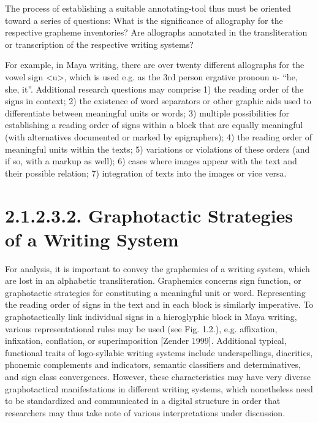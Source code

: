 \documentclass[amsthm,ebook]{saparticle}
\begin{document}
The process of establishing a suitable annotating-tool thus must be oriented toward a series of questions: What is the
significance of allography for the respective grapheme inventories? Are allographs annotated in the transliteration or
transcription of the respective writing systems? 

For example, in Maya writing, there are over twenty different allographs for the vowel sign {\textless}u{\textgreater},
which is used e.g. as the 3rd person ergative pronoun u- “he, she, it”. Additional research questions may comprise 1)
the reading order of the signs in context; 2) the existence of word separators or other graphic aids used to
differentiate between meaningful units or words; 3) multiple possibilities for establishing a reading order of signs
within a block that are equally meaningful (with alternatives documented or marked by epigraphers); 4) the reading
order of meaningful units within the texts; 5) variations or violations of these orders (and if so, with a markup as
well); 6) cases where images appear with the text and their possible relation; 7) integration of texts into the images
or vice versa.


\bigskip

\section[2.1.2.3.2. Graphotactic Strategies of a Writing System ]{2.1.2.3.2. Graphotactic Strategies of a Writing System
}
For analysis, it is important to convey the graphemics of a writing system, which are lost in an alphabetic
transliteration. Graphemics concerns sign function, or graphotactic strategies for constituting a meaningful unit or
word. Representing the reading order of signs in the text and in each block is similarly imperative. To
graphotactically link individual signs in a hieroglyphic block in Maya writing, various representational rules may be
used (see Fig. 1.2.), e.g. affixation, infixation, conflation, or superimposition [Zender 1999]. Additional typical,
functional traits of logo-syllabic writing systems include underspellings, diacritics, phonemic complements and
indicators, semantic classifiers and determinatives, and sign class convergences. However, these characteristics may
have very diverse graphotactical manifestations in different writing systems, which nonetheless need to be standardized
and communicated in a digital structure in order that researchers may thus take note of various interpretations under
discussion. 
\end{document}
